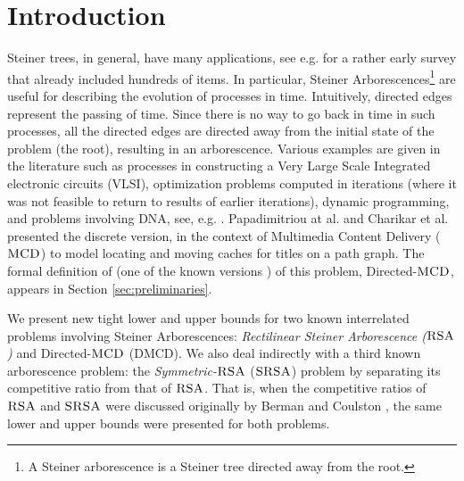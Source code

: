 \documentclass[11pt]{article}
\newcommand{\MCD}{\mbox{\sc MCD}}
\newcommand{\DMCD}{\mbox{\sc DMCD}}
\newcommand{\StRSA}{\mbox{\sc SRSA}}
\newcommand{\RSA}{\mbox{\sc RSA}}
\begin{document}
\section{Introduction}
\label{sec: Introduction}

Steiner trees, in general, have many applications, see e.g.
\cite{steiner-book} for a rather early survey that already included hundreds of items.
In particular, Steiner Arborescences\footnote{A Steiner arborescence is a Steiner tree directed away from the root.
}
are useful for describing the evolution of processes in time.
Intuitively, directed edges represent the passing of time.
Since there is no way to go back in time in such processes, all the directed edges are directed away from the initial state of the problem (the root), resulting in an arborescence. Various examples are given in the literature
such as processes in constructing a
Very Large Scale Integrated electronic circuits (VLSI),
optimization problems computed in iterations (where it was not feasible to return to results of earlier iterations),
dynamic programming, and problems involving DNA, see, e.g. \cite{berman,CDL01,vlsi,KnuthYao09}.
Papadimitriou at al. \cite{papa1,papa3} and Charikar et al. \cite{halperin} presented the discrete version, in the context of Multimedia Content Delivery ($\MCD$)
to model locating and moving caches for titles on a path graph.
The formal definition of (one of the known versions ) of this problem, Directed-$\MCD$,
appears in Section \ref{sec:preliminaries}.







We present new tight lower and upper bounds for two known interrelated problems involving Steiner Arborescences:
{\em Rectilinear Steiner Arborescence ($\RSA$)} and Directed-$\MCD$ (\DMCD).
We also deal indirectly with a third known arborescence problem: the {\em Symmetric-$\RSA$} ($\StRSA$) problem
by separating its competitive ratio from that of $\RSA$. That is, when the competitive ratios of $\RSA$ and $\StRSA$ were discussed originally by Berman and Coulston \cite{berman}, the same lower and upper bounds were  presented for both problems.
\end{document}
